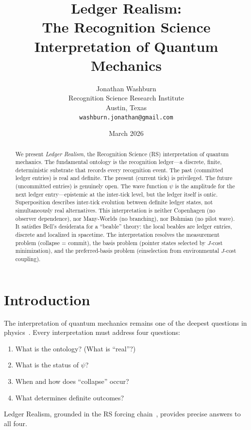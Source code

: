 \documentclass[12pt,a4paper]{article}
\title{Ledger Realism:\\
The Recognition Science Interpretation of Quantum Mechanics}
\author{Jonathan Washburn\\
Recognition Science Research Institute\\
Austin, Texas\\
\texttt{washburn.jonathan@gmail.com}}
\date{March 2026}
\theoremstyle{definition}
\theoremstyle{remark}
\begin{document}
\maketitle

\begin{abstract}
We present \emph{Ledger Realism}, the Recognition Science (RS)
interpretation of quantum mechanics.  The fundamental ontology is
the recognition ledger---a discrete, finite, deterministic
substrate that records every recognition event.  The past
(committed ledger entries) is real and definite.  The present
(current tick) is privileged.  The future (uncommitted entries) is
genuinely open.  The wave function $\psi$ is the amplitude for the
next ledger entry---epistemic at the inter-tick level, but the
ledger itself is ontic.  Superposition describes inter-tick
evolution between definite ledger states, not simultaneously real
alternatives.  This interpretation is neither Copenhagen (no
observer dependence), nor Many-Worlds (no branching), nor Bohmian
(no pilot wave).  It satisfies Bell's desiderata for a ``beable''
theory: the local beables are ledger entries, discrete and
localized in spacetime.  The interpretation resolves the
measurement problem (collapse = commit), the basis problem
(pointer states selected by $J$-cost minimization), and the
preferred-basis problem (einselection from environmental $J$-cost
coupling).
\end{abstract}

\section{Introduction}
\label{sec:intro}

The interpretation of quantum mechanics remains one of the deepest
questions in physics~\cite{Bell1987}.  Every interpretation must
address four questions:
\begin{enumerate}[label=(\roman*)]
  \item What is the ontology? (What is ``real''?)
  \item What is the status of $\psi$?
  \item When and how does ``collapse'' occur?
  \item What determines definite outcomes?
\end{enumerate}
Ledger Realism, grounded in the RS forcing chain~\cite{RS_Axioms},
provides precise answers to all four.
\end{document}
